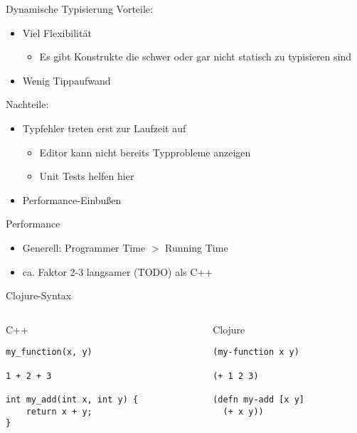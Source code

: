 \documentclass[presentation]{beamer}
\def\cpp{C++}
\begin{document}
\begin{frame}{Dynamische Typisierung}
  Vorteile:
  \begin{itemize}
  \item Viel Flexibilität
    \begin{itemize}
    \item Es gibt Konstrukte die schwer oder gar nicht statisch zu typisieren sind
    \end{itemize}
  \item Wenig Tippaufwand
  \end{itemize}

  Nachteile:
  \begin{itemize}
  \item Typfehler treten erst zur Laufzeit auf
    \begin{itemize}
    \item Editor kann nicht bereits Typprobleme anzeigen
    \item Unit Tests helfen hier
    \end{itemize}
  \item Performance-Einbußen
  \end{itemize}
\end{frame}

\begin{frame}{Performance}
  \begin{itemize}
  \item Generell: Programmer Time $>$ Running Time
  \item ca. Faktor 2-3 langsamer (TODO) als C++
  \end{itemize}
\end{frame}

\begin{frame}[fragile]{Clojure-Syntax}
  \begin{columns}
    \begin{column}{0.5\textwidth}
      \begin{block}{\cpp}
\begin{verbatim}
my_function(x, y)

1 + 2 + 3

int my_add(int x, int y) {
    return x + y;
}
\end{verbatim}
      \end{block}
    \end{column}
    \begin{column}{0.5\textwidth}
      \begin{block}{Clojure}
\begin{verbatim}
(my-function x y)

(+ 1 2 3)

(defn my-add [x y]
  (+ x y))

\end{verbatim}
      \end{block}
    \end{column}
  \end{columns}
\end{frame}
\end{document}
